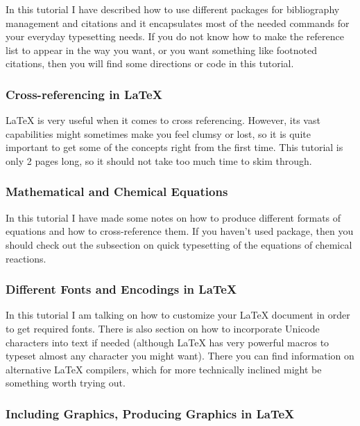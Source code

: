 \documentclass[
    draft
    ]{scrartcl}
\begin{document}
%
In this tutorial I have described how to use different packages for bibliography
    management and citations and it encapsulates most of the needed commands for
    your everyday typesetting needs.
%
If you do not know how to make the reference list to appear in the way you want,
    or you want something like footnoted citations, then you will find some
    directions or code in this tutorial.
    
%
\subsubsection{Cross-referencing in \LaTeX{}}

%
\LaTeX{} is very useful when it comes to cross referencing.
%
However, its vast capabilities might sometimes make you feel clumsy or lost, so
    it is quite important to get some of the concepts right from the first time.
%
This tutorial is only 2 pages long, so it should not take too much time to skim
    through.

%
\subsubsection{Mathematical and Chemical Equations}

%
In this tutorial I have made some notes on how to produce different formats of
    equations and how to cross-reference them.
%
If you haven't used  package, then you should check out the
    subsection on quick typesetting of the equations of chemical reactions.
    
%
\subsubsection{Different Fonts and Encodings in \LaTeX{}}

%
In this tutorial I am talking on how to customize your \LaTeX{} document in
    order to get required fonts.
%
There is also section on how to incorporate Unicode characters into text if
    needed (although \LaTeX{} has very powerful macros to typeset almost any
    character you might want).
%
There you can find information on alternative \LaTeX{} compilers, which for more
    technically inclined might be something worth trying out.

%
\subsubsection{Including Graphics, Producing Graphics in \LaTeX{}}
\end{document}
